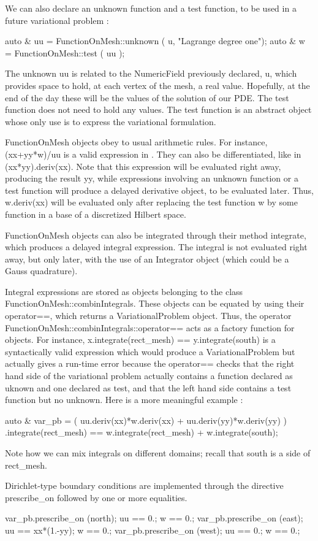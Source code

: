 We can also declare an unknown function and a test function, to be used in a future variational
problem :

\verbatim
   auto & uu = FunctionOnMesh::unknown ( u, "Lagrange degree one");
   auto & w = FunctionOnMesh::test ( uu );
\endverbatim

The unknown {\codett uu} is related to the {\codett NumericField} previously declared,
{\codett u}, which provides space to hold, at each vertex of the mesh, a real value.
Hopefully, at the end of the day these will be the values of the solution of our PDE.
The test function does not need to hold any values.
The test function is an abstract object whose only use is to express the
variational formulation.

{\codett FunctionOnMesh} objects obey to usual arithmetic rules.
For instance, {\codett (xx+yy*w)/uu} is a valid expression in \maniFEM.
They can also be differentiated, like in {\codett (xx*yy).deriv(xx)}.
Note that this expression will be evaluated right away, producing the result
{\codett yy}, while expressions involving an unknown function or a test function
will produce a delayed derivative object, to be evaluated later.
Thus, {\codett w.deriv(xx)} will be evaluated only after replacing the test function
{\codett w} by some function in a base of a discretized Hilbert space.

{\codett FunctionOnMesh} objects can also be integrated through their method
{\codett integrate}, which produces a delayed integral expression.
The integral is not evaluated right away, but only later, with the use of an
{\codett Integrator} object (which could be a Gauss quadrature).

Integral expressions are stored as objects belonging to the class\hfil\break
{\codett FunctionOnMesh::combinIntegrals}.
These objects can be equated by using their\hfil\break
{\codett operator==}, which returns a {VariationalProblem} object.
Thus, the operator\hfil\break
{\codett FunctionOnMesh::combinIntegrals::operator==} acts as a factory function
for\hfil{} objects.
For instance, {\codett x.integrate(rect\_mesh) == y.integrate(south)} is a syntactically valid
expression which would produce a {\codett VariationalProblem} but actually
gives a run-time error because the {\codett operator==} checks that the right hand side
of the variational problem actually contains a function declared as uknown and one
declared as test, and that the left hand side contains a test function but no unknown.
Here is a more meaningful example :

\verbatim
   auto & var_pb =
       ( uu.deriv(xx)*w.deriv(xx) + uu.deriv(yy)*w.deriv(yy) ) .integrate(rect_mesh)
       == w.integrate(rect_mesh) + w.integrate(south);
\endverbatim

Note how we can mix integrals on different domains; recall that {\codett south} is
a side of {\codett rect\_mesh}.

Dirichlet-type boundary conditions are implemented through the directive
{\codett prescribe\_on} followed by one or more equalities.

\verbatim
   var_pb.prescribe_on (north);  uu == 0.;          w == 0.;
   var_pb.prescribe_on (east);   uu == xx*(1.-yy);  w == 0.;
   var_pb.prescribe_on (west);   uu == 0.;          w == 0.;
\endverbatim
